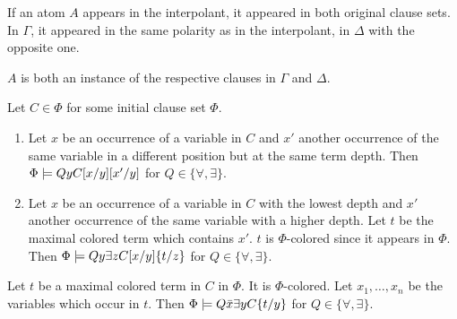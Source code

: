\documentclass[,%
	paper=a4,%
	DIV14, 
	liststotoc,
	bibtotoc,
	draft=false,%
	numbers=noendperiod
]{scrartcl}
\begin{document}
\begin{lemma}
	\label{lemma:interpolant_atom_origin}
	If an atom $A$ appears in the interpolant, it appeared in both original clause sets.
	In $\Gamma$, it appeared in the same polarity as in the interpolant,
	in $\Delta$ with the opposite one.

	$A$ is both an instance of the respective clauses in $\Gamma$ and $\Delta$.
\end{lemma}

\begin{lemma}
	Let $C \in \Phi$ for some initial clause set $\Phi$. 
	\begin{enumerate}
			\item
				Let $x$ be an occurrence of a variable in $C$ and $x'$ another occurrence of the same variable in a different position but at the same term depth.
				Then $\Phi \models Q y C[x/y][x'/y]$ for $Q \in \{\forall, \exists\}$.

			\item
				Let $x$ be an occurrence of a variable in $C$ with the lowest depth and $x'$ another occurrence of the same variable with a higher depth.
				Let $t$ be the maximal colored term which contains $x'$. $t$ is $\Phi$-colored since it appears in $\Phi$.
				Then $\Phi \models Q y \exists z C[x/y]\{t/z\}$ for $Q \in \{\forall, \exists\}$.
	\end{enumerate}
\end{lemma}

\begin{lemma}

	Let $t$ be a maximal colored term in $C$ in $\Phi$. It is $\Phi$-colored.
	Let $x_1, \ldots, x_n$ be the variables which occur in $t$.
	Then $\Phi \models Q \bar x \exists y C\{t/y\}$ for $Q \in \{\forall, \exists\}$.

\end{lemma}
\end{document}
